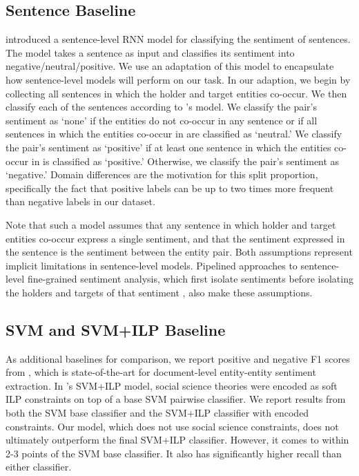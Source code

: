 \documentclass[11pt,a4paper]{article}
\begin{document}
\subsection{Sentence Baseline}
 \citet{Socher:13} introduced a sentence-level RNN model for classifying the sentiment of sentences.
The model takes a sentence as input and classifies its sentiment into negative/neutral/positive.
We use an adaptation of this model to encapsulate how sentence-level models will perform on our task.
In our adaption, we begin by collecting all sentences in which the holder and target entities co-occur.
We then classify each of the sentences according to  \citet{Socher:13}'s model.
We classify the pair's sentiment as `none' if the entities do not co-occur in any sentence or if all sentences in which the entities co-occur in are classified as `neutral.'
We classify the pair's sentiment as `positive' if at least one sentence in which the entities co-occur in is classified as `positive.'
Otherwise, we classify the pair's sentiment as `negative.' %
Domain differences are the motivation for this split proportion, specifically the fact that positive labels can be up to two times more frequent than negative labels in our dataset.
\par Note that such a model assumes that any sentence in which holder and target entities co-occur express a single sentiment, and that the sentiment expressed in the sentence is the sentiment between the entity pair.
Both assumptions represent implicit limitations in sentence-level models.
Pipelined approaches to sentence-level fine-grained sentiment analysis, which first isolate sentiments before isolating the holders and targets of that sentiment \citep{Kim:2006}, also make these assumptions.

\subsection{SVM and SVM+ILP Baseline}
As additional baselines for comparison, we report positive and negative F1 scores from \citet{Choi:16}, which is state-of-the-art for document-level entity-entity sentiment extraction.
In \citet{Choi:16}'s SVM+ILP model, social science theories were encoded as soft ILP constraints on top of a base SVM pairwise classifier.
We report results from both the SVM base classifier and the SVM+ILP classifier with encoded constraints.
Our model, which does not use social science constraints, does not ultimately outperform the final SVM+ILP classifier.
However, it comes to within 2-3 points of the SVM base classifier.
It also has significantly higher recall than either classifier.
\end{document}
